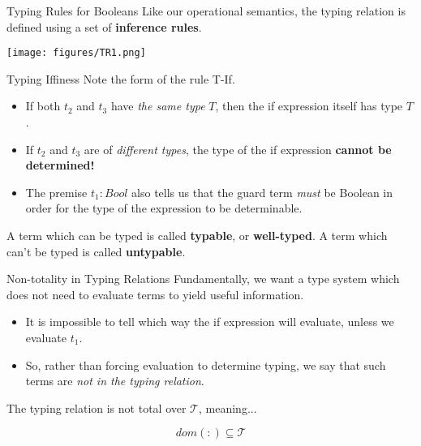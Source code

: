 \documentclass[11pt]{beamer}
\begin{document}
\begin{frame}[fragile=singleslide]{Typing Rules for Booleans}
Like our operational semantics, the typing relation is defined using a set of \textbf{inference rules}.
\begin{center}
\texttt{[image: figures/TR1.png]}
\end{center}
\end{frame}

\begin{frame}[fragile=singleslide]{Typing Iffiness}
Note the form of the rule T-If.
\begin{itemize}
\item If both $t_2$ and $t_3$ have \emph{the same type} $T$, then the if expression itself has type $T$.
\item If $t_2$ and $t_3$ are of \emph{different types}, the type of the if expression \textbf{cannot be determined!}
\item The premise $t_1 : Bool$ also tells us that the guard term \emph{must} be Boolean in order for the type of the expression to be determinable.  
\end{itemize}
A term which can be typed is called \textbf{typable}, or \textbf{well-typed}. A term which can't be typed is called \textbf{untypable}.
\end{frame}


\begin{frame}[fragile=singleslide]{Non-totality in Typing Relations}
Fundamentally, we want a type system which does not need to evaluate terms to yield useful information.  
\begin{itemize}
\item It is impossible to tell which way the if expression will evaluate, unless we evaluate $t_1$.  
\item So, rather than forcing evaluation to determine typing, we say that such terms are \emph{not in the typing relation}.  
\end{itemize}
The typing relation is not total over $\mathcal{T}$, meaning...

\begin{equation}
dom(:) \subseteq \mathcal{T}
\end{equation}

\end{frame}
\end{document}

